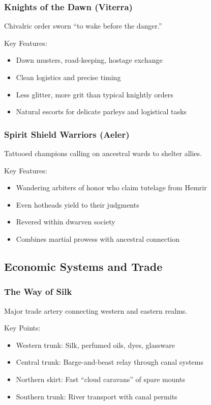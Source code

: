 \subsubsection{Knights of the Dawn (Viterra)}
\label{sec:dawnknights}

Chivalric order sworn ``to wake before the danger.''

Key Features:
\begin{itemize}
    \item Dawn musters, road-keeping, hostage exchange
    \item Clean logistics and precise timing
    \item Less glitter, more grit than typical knightly orders
    \item Natural escorts for delicate parleys and logistical tasks
\end{itemize}

\subsubsection{Spirit Shield Warriors (Aeler)}
\label{sec:spiritshields}

Tattooed champions calling on ancestral wards to shelter allies.

Key Features:
\begin{itemize}
    \item Wandering arbiters of honor who claim tutelage from Hemrir
    \item Even hotheads yield to their judgments
    \item Revered within dwarven society
    \item Combines martial prowess with ancestral connection
\end{itemize}

\subsection{Economic Systems and Trade}

\subsubsection{The Way of Silk}
\label{sec:wayofsilk}

Major trade artery connecting western and eastern realms.

Key Points:
\begin{itemize}
    \item Western trunk: Silk, perfumed oils, dyes, glassware
    \item Central trunk: Barge-and-beast relay through canal systems
    \item Northern skirt: Fast ``cloud caravans'' of spare mounts
    \item Southern trunk: River transport with canal permits
\end{itemize}

